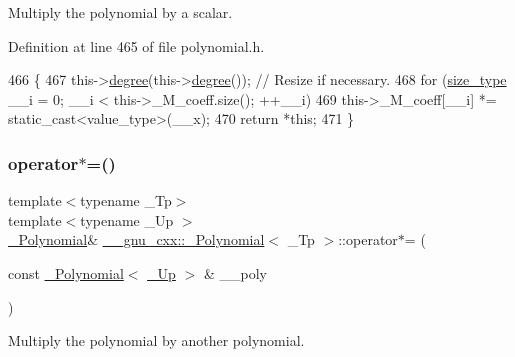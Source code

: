 Multiply the polynomial by a scalar. 

Definition at line 465 of file polynomial.\+h.


\begin{DoxyCode}
466         \{
467           this->\hyperlink{class____gnu__cxx_1_1__Polynomial_a07d9933aeeb9afbd823218ed921336cb}{degree}(this->\hyperlink{class____gnu__cxx_1_1__Polynomial_a07d9933aeeb9afbd823218ed921336cb}{degree}()); \textcolor{comment}{// Resize if necessary.}
468           \textcolor{keywordflow}{for} (\hyperlink{class____gnu__cxx_1_1__Polynomial_a6afe219c123c7a2fdc5abac8a6639053}{size\_type} \_\_i = 0; \_\_i < this->\_M\_coeff.size(); ++\_\_i)
469             this->\_M\_coeff[\_\_i] *= static\_cast<value\_type>(\_\_x);
470           \textcolor{keywordflow}{return} *\textcolor{keyword}{this};
471         \}
\end{DoxyCode}
\mbox{\label{class____gnu__cxx_1_1__Polynomial_ab7daa447472ac775ee38ef0db323bb19}} 
\subsubsection{\texorpdfstring{operator$\ast$=()}{operator*=()}\hspace{0.1cm}{\footnotesize\ttfamily [3/3]}}
{\footnotesize\ttfamily template$<$typename \+\_\+\+Tp$>$ \\
template$<$typename \+\_\+\+Up $>$ \\
\hyperlink{class____gnu__cxx_1_1__Polynomial}{\+\_\+\+Polynomial}\& \hyperlink{class____gnu__cxx_1_1__Polynomial}{\+\_\+\+\_\+gnu\+\_\+cxx\+::\+\_\+\+Polynomial}$<$ \+\_\+\+Tp $>$\+::operator$\ast$= (\begin{DoxyParamCaption}\item[{const \hyperlink{class____gnu__cxx_1_1__Polynomial}{\+\_\+\+Polynomial}$<$ \hyperlink{class____gnu__cxx_1_1__Polynomial_a242114d4b86648a5dff67a8221f80d40}{\+\_\+\+Up} $>$ \&}]{\+\_\+\+\_\+poly }\end{DoxyParamCaption})}

Multiply the polynomial by another polynomial. \mbox{\label{class____gnu__cxx_1_1__Polynomial_acbaf9cbeb167e41490d976a083f131d8}} 
